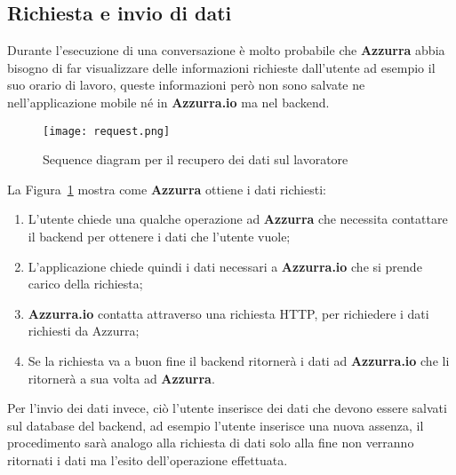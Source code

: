 \subsection{Richiesta e invio di dati}
Durante l'esecuzione di una conversazione è molto probabile che \textbf{Azzurra} abbia bisogno di far visualizzare delle informazioni richieste dall'utente ad esempio il suo orario di lavoro, queste informazioni però non sono salvate ne nell'applicazione mobile né in \textbf{Azzurra.io} ma nel backend.
\begin{figure}[h]
	\begin{center}
		\texttt{[image: request.png]}
		\caption{Sequence diagram per il recupero dei dati sul lavoratore}\label{fig:request}
	\end{center}
\end{figure}
La Figura~\ref{fig:request} mostra come \textbf{Azzurra} ottiene i dati richiesti:
\begin{enumerate}
	\item L'utente chiede una qualche operazione ad \textbf{Azzurra} che necessita contattare il backend per ottenere i dati che l'utente vuole;
	\item L'applicazione chiede quindi i dati necessari a \textbf{Azzurra.io} che si prende carico della richiesta;
	\item \textbf{Azzurra.io} contatta attraverso una richiesta HTTP, per richiedere i dati richiesti da Azzurra;
	\item Se la richiesta va a buon fine il backend ritornerà i dati ad \textbf{Azzurra.io} che li ritornerà a sua volta ad \textbf{Azzurra}.
\end{enumerate}

Per l'invio dei dati invece, ciò l'utente inserisce dei dati che devono essere salvati sul database del backend, ad esempio l'utente inserisce una nuova assenza, il procedimento sarà analogo alla richiesta di dati solo alla fine non verranno ritornati i dati ma l'esito dell'operazione effettuata.
